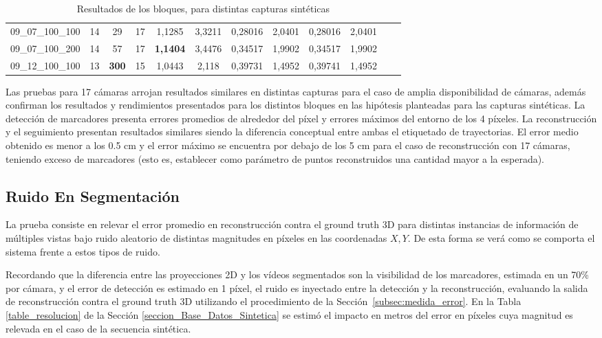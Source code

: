 \begin{table}[ht!]
{\begin{tabular}{cccc|c|c|c|c|c|c|ll}
\multicolumn{1}{|c|}{09\_07\_100\_100}  & \multicolumn{1}{c|}{14}         & \multicolumn{1}{c|}{29}     & 17      & 1,1285 & 3,3211  & 0,28016     & 2,0401  & 0,28016     & 2,0401  &  &  \\ \cline{1-10}
\multicolumn{1}{|c|}{09\_07\_100\_200}  & \multicolumn{1}{c|}{14}         & \multicolumn{1}{c|}{57}     & 17      & \textbf{1,1404} & 3,4476  & 0,34517     & 1,9902  & 0,34517     & 1,9902  &  &  \\ \cline{1-10}
\multicolumn{1}{|c|}{09\_12\_100\_100}  & \multicolumn{1}{c|}{13}         & \multicolumn{1}{c|}{\textbf{300}}    & 15      & 1,0443 & 2,118   & 0,39731     & 1,4952  & 0,39741     & 1,4952  &  &  \\ \cline{1-10}
\end{tabular}
}
\caption{Resultados de los bloques, para distintas capturas sintéticas}
\label{resultados_distintas_capturas}
\end{table}

Las pruebas para 17 cámaras arrojan resultados similares en distintas capturas para el caso de amplia disponibilidad de cámaras, además confirman los resultados y rendimientos presentados para los distintos bloques en las hipótesis planteadas para las capturas sintéticas. La detección de marcadores presenta errores promedios de alrededor del píxel y errores máximos del entorno de los 4 píxeles. La reconstrucción y el seguimiento presentan resultados similares siendo la diferencia conceptual entre ambas el etiquetado de trayectorias. El error medio obtenido es menor a los 0.5 cm y el error máximo se encuentra por debajo de los 5 cm para el caso de reconstrucción con 17 cámaras, teniendo exceso de marcadores (esto es, establecer como parámetro de puntos reconstruidos una cantidad mayor a la esperada). 

\subsection{Ruido En Segmentación}

La prueba consiste en relevar el error promedio en reconstrucción contra el ground truth 3D para distintas instancias de información de múltiples vistas bajo ruido aleatorio de distintas magnitudes en píxeles en las coordenadas $X,Y$. De esta forma se verá como se comporta el sistema frente a estos tipos de ruido.

 Recordando que la diferencia entre las proyecciones 2D y los vídeos segmentados son la visibilidad de los marcadores, estimada en un 70\% por cámara, y el error de detección es estimado en 1 píxel, el ruido es inyectado entre la detección y la reconstrucción, evaluando la salida de reconstrucción contra el ground truth 3D utilizando el procedimiento de la Sección~\ref{subsec:medida_error}. En la Tabla \ref{table_resolucion} de la Sección \ref{seccion_Base_Datos_Sintetica} se estimó el impacto en metros del error en píxeles cuya magnitud es relevada en el caso de la secuencia sintética.

